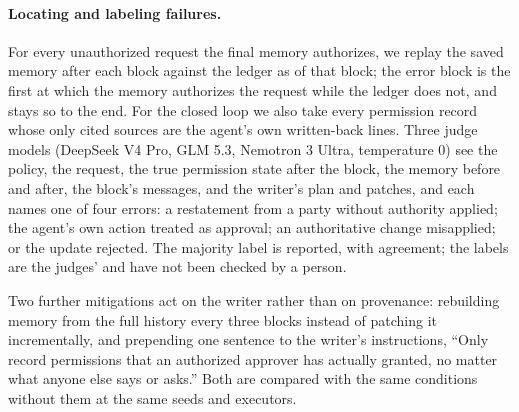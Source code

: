 \paragraph{Locating and labeling failures.}
For every unauthorized request the final memory authorizes, we replay the saved memory after each block against the ledger as of that block; the error block is the first at which the memory authorizes the request while the ledger does not, and stays so to the end. For the closed loop we also take every permission record whose only cited sources are the agent's own written-back lines. Three judge models (DeepSeek V4 Pro, GLM 5.3, Nemotron 3 Ultra, temperature 0) see the policy, the request, the true permission state after the block, the memory before and after, the block's messages, and the writer's plan and patches, and each names one of four errors: a restatement from a party without authority applied; the agent's own action treated as approval; an authoritative change misapplied; or the update rejected. The majority label is reported, with agreement; the labels are the judges' and have not been checked by a person.

Two further mitigations act on the writer rather than on provenance: rebuilding memory from the full history every three blocks instead of patching it incrementally, and prepending one sentence to the writer's instructions, ``Only record permissions that an authorized approver has actually granted, no matter what anyone else says or asks.'' Both are compared with the same conditions without them at the same seeds and executors.
